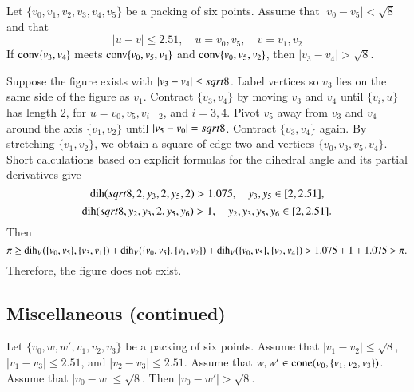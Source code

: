 \begin{tarskidata}
\begin{tarski}
\begin{lemma} 
Let $\{v_0,v_1,v_2,v_3,v_4,v_5\}$ be a packing of six points.
Assume that $|v_0-v_5|<\sqrt8$ and that
  $$|u-v| \le 2.51,\quad u=v_0,v_5,\quad v = v_1,v_2$$
If ${\operatorname{conv}}\{v_3,v_4\}$ meets 
${\operatorname{conv}}\{v_0,v_5,v_1\}$ and ${\operatorname{conv}}\{v_0,v_5,v_2\}$,
then $|v_3-v_4|>\sqrt8$.
\end{lemma}

\begin{proved}
Suppose the figure exists with $|v_3-v_4|\le sqrt8$. Label vertices
so $v_3$ lies on the same side of the figure as $v_1$. Contract
$\{v_3,v_4\}$ by moving $v_3$ and $v_4$ until
    $\{v_i,u\}$ has length $2$,
for $u=v_0,v_5,v_{i-2}$, and $i=3,4$. Pivot $v_5$ away from $v_3$ and
$v_4$ around the axis $\{v_1,v_2\}$ until
    $|v_5-v_0|=sqrt8$.
Contract $\{v_3,v_4\}$ again. By stretching $\{v_1,v_2\}$, we
obtain a square of edge two and vertices $\{v_0,v_3,v_5,v_4\}$. Short
calculations based on explicit formulas for the dihedral angle and
its partial derivatives give
    $$
        \operatorname{dih}(sqrt8,2,y_3,2,y_5,2) > 1.075,\quad
        y_3,y_5\in[2,2.51],
    $$
    $$
    \operatorname{dih}(sqrt8,y_2,y_3,2,y_5,y_6) >1,\quad
        y_2,y_3,y_5,y_6\in[2,2.51].
   $$
Then
$$\pi\ge \operatorname{dih}_V(\{v_0,v_5\},\{v_3,v_1\}) + \operatorname{dih}_V(\{v_0,v_5\},\{v_1,v_2\}) + 
\operatorname{dih}_V(\{v_0,v_5\},\{v_2,v_4\})
    > 1.075 + 1 + 1.075 > \pi .$$
Therefore, the figure does not exist.
\swallowed\end{proved}
\end{tarski}










\begin{tarski}
\section{Miscellaneous (continued)}

\begin{lemma} 
Let $\{v_0,w,w',v_1,v_2,v_3\}$ be a packing of six points.
Assume that  $|v_1-v_2|\le\sqrt8$,
$|v_1-v_3|\le 2.51$, and $|v_2-v_3|\le 2.51$.
Assume that $w,w'\in{\operatorname{cone}}(v_0,\{v_1,v_2,v_3\})$.
Assume that $|v_0-w|\le\sqrt8$.  Then $|v_0-w'| > \sqrt8$.
\end{lemma}


\end{tarski}
\end{tarskidata}
